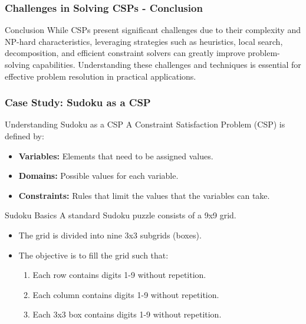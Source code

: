 \documentclass[aspectratio=169]{beamer}
\begin{document}
\begin{frame}[fragile]
    \frametitle{Challenges in Solving CSPs - Conclusion}
    \begin{block}{Conclusion}
        While CSPs present significant challenges due to their complexity and NP-hard characteristics, leveraging strategies such as heuristics, local search, decomposition, and efficient constraint solvers can greatly improve problem-solving capabilities. Understanding these challenges and techniques is essential for effective problem resolution in practical applications.
    \end{block}
\end{frame}

\begin{frame}[fragile]
    \frametitle{Case Study: Sudoku as a CSP}

    \begin{block}{Understanding Sudoku as a CSP}
        A Constraint Satisfaction Problem (CSP) is defined by:
        \begin{itemize}
            \item \textbf{Variables:} Elements that need to be assigned values.
            \item \textbf{Domains:} Possible values for each variable.
            \item \textbf{Constraints:} Rules that limit the values that the variables can take.
        \end{itemize}
    \end{block}

    \begin{block}{Sudoku Basics}
        A standard Sudoku puzzle consists of a 9x9 grid.
        \begin{itemize}
            \item The grid is divided into nine 3x3 subgrids (boxes).
            \item The objective is to fill the grid such that:
            \begin{enumerate}
                \item Each row contains digits 1-9 without repetition.
                \item Each column contains digits 1-9 without repetition.
                \item Each 3x3 box contains digits 1-9 without repetition.
            \end{enumerate}
        \end{itemize}
    \end{block}
\end{frame}
\end{document}
